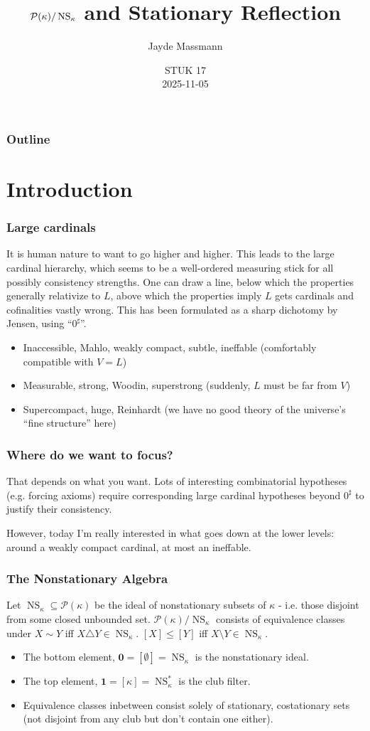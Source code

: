 \documentclass{beamer}
\title{$\mathcal{P}(\kappa)/\NS_\kappa$ and Stationary Reflection}
\author{Jayde Massmann}
\date{STUK 17 \\ 2025-11-05}
\newcommand{\NS}{\operatorname{NS}}
\begin{document}
\frame{\titlepage}

\begin{frame}
\frametitle{Outline}
\tableofcontents
\end{frame}

\section{Introduction}

\begin{frame}
\frametitle{Large cardinals}
It is human nature to want to go higher and higher. This leads to the large cardinal hierarchy, which seems to be a \alert{well-ordered} measuring stick for all possibly consistency strengths. \pause One can draw a line, below which the properties generally relativize to $L$, above which the properties imply $L$ gets cardinals and cofinalities vastly wrong. This has been formulated as a sharp \alert{dichotomy} by Jensen, using ``$0^\sharp$''. \pause

\begin{itemize}
\item Inaccessible, Mahlo, weakly compact, subtle, ineffable (comfortably compatible with $V = L$) \pause
\item Measurable, strong, Woodin, superstrong (suddenly, $L$ must be far from $V$) \pause
\item Supercompact, huge, Reinhardt (we have no good theory of the universe's ``fine structure'' here)
\end{itemize}
\end{frame}

\begin{frame}
\frametitle{Where do we want to focus?}
That depends on what you want. Lots of interesting combinatorial hypotheses (e.g. forcing axioms) require corresponding large cardinal hypotheses beyond $0^\sharp$ to justify their consistency. \pause

However, today I'm really interested in what goes down at the lower levels: around a \alert{weakly compact} cardinal, at most an \alert{ineffable}.
\end{frame}

\begin{frame}
\frametitle{The Nonstationary Algebra}
Let $\NS_\kappa \subseteq \mathcal{P}(\kappa)$ be the ideal of nonstationary subsets of $\kappa$ - i.e. those disjoint from some closed unbounded set. $\mathcal{P}(\kappa)/\NS_\kappa$ consists of equivalence classes under $X \sim Y$ iff $X \triangle Y \in \NS_\kappa$. $[X] \leq [Y]$ iff $X \setminus Y \in \NS_\kappa$. \pause

\begin{itemize}
\item The bottom element, $\mathbf{0} = [\emptyset] = \NS_\kappa$ is the nonstationary ideal.
\item The top element, $\mathbf{1} = [\kappa] = \NS_\kappa^*$ is the club filter.
\item Equivalence classes inbetween consist solely of stationary, costationary sets (not disjoint from any club but don't contain one either).
\end{itemize}
\end{frame}
\end{document}
